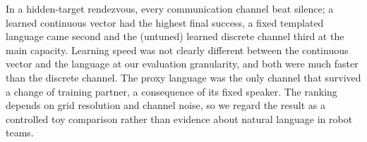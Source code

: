 In a hidden-target rendezvous, every communication channel beat silence; a learned continuous vector had the highest final success, a fixed templated language came second and the (untuned) learned discrete channel third at the main capacity. Learning speed was not clearly different between the continuous vector and the language at our evaluation granularity, and both were much faster than the discrete channel. The proxy language was the only channel that survived a change of training partner, a consequence of its fixed speaker. The ranking depends on grid resolution and channel noise, so we regard the result as a controlled toy comparison rather than evidence about natural language in robot teams.
